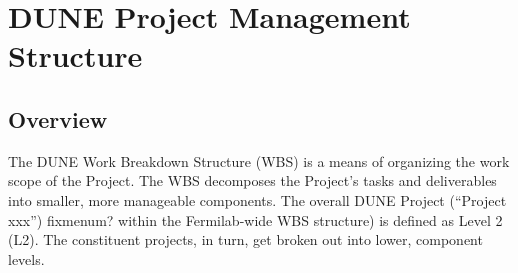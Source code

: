 \chapter{DUNE Project Management Structure}
\label{ch:detectors-pm}

\section{Overview}

The DUNE Work Breakdown Structure (WBS) is a means of organizing the work scope of the Project. 
The WBS decomposes the Project's tasks and deliverables into smaller, more manageable components. 
The overall DUNE Project (``Project xxx'') fixme{num?} within the Fermilab-wide WBS structure) is defined as Level 2 (L2). The constituent projects, in turn, get broken out into lower, component levels.

